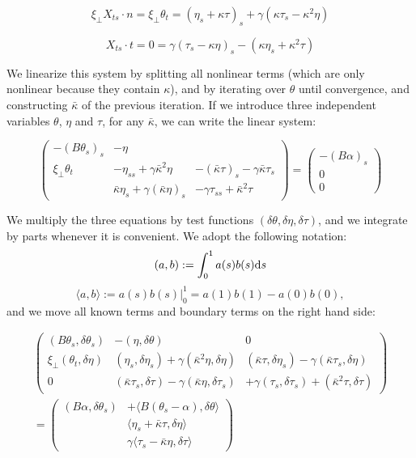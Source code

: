 \[ \xi_\perp X_{ts}\cdot n =\xi_\perp \theta_t =   (\eta_s + \kappa \tau)_s + \gamma (\kappa \tau_s - \kappa^2 \eta)\]

\[X_{ts}\cdot t = 0 =  \gamma(\tau_s - \kappa \eta)_s - (\kappa \eta_s + \kappa^2 \tau) \]

We linearize this system by splitting all nonlinear terms (which are
only nonlinear because they contain \(\kappa\)), and by iterating over
\(\theta\) until convergence, and constructing \(\bar\kappa\) of the
previous iteration. If we introduce three independent variables
\(\theta\), \(\eta\) and \(\tau\), for any \(\bar\kappa\), we can write
the linear system:

\[\begin{pmatrix}
-(B\theta_s)_s & -\eta &  \\
\xi_\perp\theta_t & 
-\eta_{ss} + \gamma \bar \kappa^2\eta &
- (\bar\kappa\tau)_s - \gamma\bar\kappa\tau_s \\
 & 
\bar \kappa\eta_s +\gamma(\bar \kappa\eta)_s &
 - \gamma\tau_{ss} + \bar \kappa^2 \tau
\end{pmatrix}
%
=
\begin{pmatrix}
-(B\alpha)_s\\
0\\
0
\end{pmatrix}\]

We multiply the three equations by test functions
$(\delta \theta, \delta\eta, \delta \tau)$, and we integrate by parts
whenever it is convenient. We adopt the following notation:
\[
(a,b) := \int_0^1 a(s) b(s) \mathrm{d} s
\]
\[
\langle a,b \rangle := a(s) b(s) \big|^1_0 = a(1)b(1)-a(0)b(0),
\]
and we move all known terms and boundary terms on the right hand side:

\begin{multline}
\begin{pmatrix}
(B\theta_s, \delta \theta_s)  &  -(\eta,\delta\theta)  & 0 \\
\xi_\perp(\theta_t, \delta \eta) & 
(\eta_{s}, \delta \eta_s) 
+ \gamma (\bar \kappa^2\eta, \delta\eta) &
 (\bar\kappa\tau, \delta\eta_s) 
- \gamma(\bar\kappa\tau_s, \delta\eta) \\
0 & 
(\bar \kappa\tau_s, \delta\tau) 
-\gamma(\bar \kappa\eta, \delta\tau_s) &
%
%
+ \gamma(\tau_{s},\delta\tau_s) 
+ (\bar \kappa^2 \tau, \delta\tau)
\end{pmatrix}
%
\\
=
\begin{pmatrix}
(B\alpha, \delta \theta_s)& +\langle B(\theta_s-\alpha), \delta \theta\rangle\\
& \langle \eta_s+\bar\kappa\tau,\delta\eta\rangle
\\
&\gamma\langle\tau_{s}-\bar \kappa\eta, \delta\tau\rangle 
\end{pmatrix}
\end{multline}

